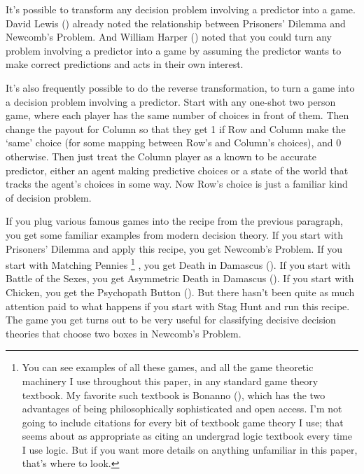 \documentclass[
  11pt,
  letterpaper,
  DIV=11,
  numbers=noendperiod,
  twoside]{scrartcl}
\begin{document}
It's possible to transform any decision problem involving a predictor
into a game. David Lewis () already noted
the relationship between Prisoners' Dilemma and Newcomb's Problem. And
William Harper () noted that you could
turn any problem involving a predictor into a game by assuming the
predictor wants to make correct predictions and acts in their own
interest.

It's also frequently possible to do the reverse transformation, to turn
a game into a decision problem involving a predictor. Start with any
one-shot two person game, where each player has the same number of
choices in front of them. Then change the payout for Column so that they
get 1 if Row and Column make the `same' choice (for some mapping between
Row's and Column's choices), and 0 otherwise. Then just treat the Column
player as a known to be accurate predictor, either an agent making
predictive choices or a state of the world that tracks the agent's
choices in some way. Now Row's choice is just a familiar kind of
decision problem.

If you plug various famous games into the recipe from the previous
paragraph, you get some familiar examples from modern decision theory.
If you start with Prisoners' Dilemma and apply this recipe, you get
Newcomb's Problem. If you start with Matching Pennies \footnote{You can
  see examples of all these games, and all the game theoretic machinery
  I use throughout this paper, in any standard game theory textbook. My
  favorite such textbook is Bonanno (),
  which has the two advantages of being philosophically sophisticated
  and open access. I'm not going to include citations for every bit of
  textbook game theory I use; that seems about as appropriate as citing
  an undergrad logic textbook every time I use logic. But if you want
  more details on anything unfamiliar in this paper, that's where to
  look.} , you get Death in Damascus
(). If you
start with Battle of the Sexes, you get Asymmetric Death in Damascus
(). If you start with Chicken,
you get the Psychopath Button (). But there hasn't been quite as much attention paid to what
happens if you start with Stag Hunt and run this recipe. The game you
get turns out to be very useful for classifying decisive decision
theories that choose two boxes in Newcomb's Problem.
\end{document}
